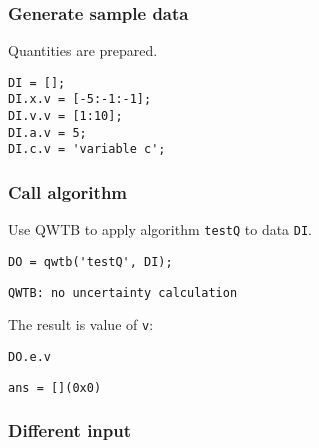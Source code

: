 \startcontents[localtoc]



{}
\subsubsection*{Generate sample data}



Quantities are prepared.

\begin{lstlisting}
DI = [];
DI.x.v = [-5:-1:-1];
DI.v.v = [1:10];
DI.a.v = 5;
DI.c.v = 'variable c';
\end{lstlisting}


{}
\subsubsection*{Call algorithm}



Use QWTB to apply algorithm \texttt{testQ} to data \texttt{DI}.

\begin{lstlisting}
DO = qwtb('testQ', DI);
\end{lstlisting}
\begin{lstlisting}[language={},xleftmargin=5pt,frame=none]
QWTB: no uncertainty calculation

\end{lstlisting}


The result is value of \texttt{v}:

\begin{lstlisting}
DO.e.v
\end{lstlisting}
\begin{lstlisting}[language={},xleftmargin=5pt,frame=none]
ans = [](0x0)

\end{lstlisting}


{}
\subsubsection*{Different input}



